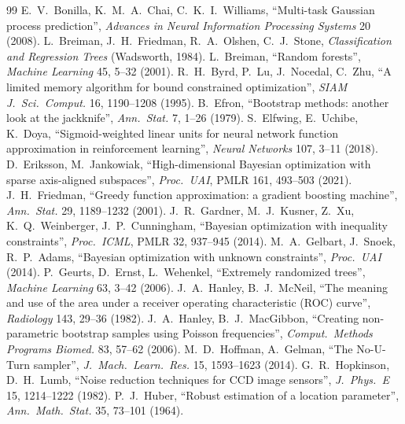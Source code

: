 \documentclass[10pt,a4paper]{article}
\begin{document}
\begin{thebibliography}{99}\small
{} E.~V.~Bonilla, K.~M.~A.~Chai, C.~K.~I.~Williams, ``Multi-task Gaussian process prediction'', \emph{Advances in Neural Information Processing Systems} 20 (2008).
 L.~Breiman, J.~H.~Friedman, R.~A.~Olshen, C.~J.~Stone, \emph{Classification and Regression Trees} (Wadsworth, 1984).
 L.~Breiman, ``Random forests'', \emph{Machine Learning} 45, 5--32 (2001).
 R.~H.~Byrd, P.~Lu, J.~Nocedal, C.~Zhu, ``A limited memory algorithm for bound constrained optimization'', \emph{SIAM J.\ Sci.\ Comput.} 16, 1190--1208 (1995).
 B.~Efron, ``Bootstrap methods: another look at the jackknife'', \emph{Ann.\ Stat.} 7, 1--26 (1979).
 S.~Elfwing, E.~Uchibe, K.~Doya, ``Sigmoid-weighted linear units for neural network function approximation in reinforcement learning'', \emph{Neural Networks} 107, 3--11 (2018).
 D.~Eriksson, M.~Jankowiak, ``High-dimensional Bayesian optimization with sparse axis-aligned subspaces'', \emph{Proc.\ UAI}, PMLR 161, 493--503 (2021).
 J.~H.~Friedman, ``Greedy function approximation: a gradient boosting machine'', \emph{Ann.\ Stat.} 29, 1189--1232 (2001).
 J.~R.~Gardner, M.~J.~Kusner, Z.~Xu, K.~Q.~Weinberger, J.~P.~Cunningham, ``Bayesian optimization with inequality constraints'', \emph{Proc.\ ICML}, PMLR 32, 937--945 (2014).
 M.~A.~Gelbart, J.~Snoek, R.~P.~Adams, ``Bayesian optimization with unknown constraints'', \emph{Proc.\ UAI} (2014).
 P.~Geurts, D.~Ernst, L.~Wehenkel, ``Extremely randomized trees'', \emph{Machine Learning} 63, 3--42 (2006).
 J.~A.~Hanley, B.~J.~McNeil, ``The meaning and use of the area under a receiver operating characteristic (ROC) curve'', \emph{Radiology} 143, 29--36 (1982).
 J.~A.~Hanley, B.~J.~MacGibbon, ``Creating non-parametric bootstrap samples using Poisson frequencies'', \emph{Comput.\ Methods Programs Biomed.} 83, 57--62 (2006).
 M.~D.~Hoffman, A.~Gelman, ``The No-U-Turn sampler'', \emph{J.\ Mach.\ Learn.\ Res.} 15, 1593--1623 (2014).
 G.~R.~Hopkinson, D.~H.~Lumb, ``Noise reduction techniques for CCD image sensors'', \emph{J.\ Phys.\ E} 15, 1214--1222 (1982).
 P.~J.~Huber, ``Robust estimation of a location parameter'', \emph{Ann.\ Math.\ Stat.} 35, 73--101 (1964).

\end{thebibliography}
\end{document}
